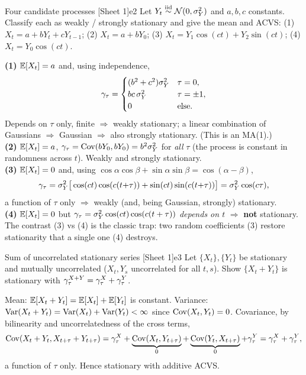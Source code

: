 \begin{exercise}{Four candidate processes \quad\textnormal{[Sheet 1]}}{e2}
Let $Y_t\overset{\text{iid}}{\sim} \mathcal N(0,\sigma_Y^2)$ and $a,b,c$ constants. Classify each as
weakly / strongly stationary and give the mean and ACVS:
(1) $X_t=a+bY_t+cY_{t-1}$;\;
(2) $X_t=a+bY_0$;\;
(3) $X_t=Y_1\cos(ct)+Y_2\sin(ct)$;\;
(4) $X_t=Y_0\cos(ct)$.
\end{exercise}
\begin{solution}
\textbf{(1)} $\mathbb{E}[X_t]=a$ and, using independence,
\[
\gamma_\tau=\begin{cases}(b^2+c^2)\sigma_Y^2 & \tau=0,\\ bc\,\sigma_Y^2 & \tau=\pm1,\\ 0 &\text{else.}\end{cases}
\]
Depends on $\tau$ only, finite $\Rightarrow$ weakly stationary; a linear
combination of Gaussians $\Rightarrow$ Gaussian $\Rightarrow$ also strongly
stationary. (This is an MA(1).)\\
\textbf{(2)} $\mathbb{E}[X_t]=a$, $\gamma_\tau=\operatorname{Cov}(bY_0,bY_0)=b^2\sigma_Y^2$ for
\emph{all} $\tau$ (the process is constant in randomness across $t$). Weakly and
strongly stationary.\\
\textbf{(3)} $\mathbb{E}[X_t]=0$ and, using
$\cos\alpha\cos\beta+\sin\alpha\sin\beta=\cos(\alpha-\beta)$,
\[
\gamma_\tau=\sigma_Y^2\big[\cos(ct)\cos(c(t{+}\tau))+\sin(ct)\sin(c(t{+}\tau))\big]
=\sigma_Y^2\cos(c\tau),
\]
a function of $\tau$ only $\Rightarrow$ weakly (and, being Gaussian, strongly)
stationary.\\
\textbf{(4)} $\mathbb{E}[X_t]=0$ but
$\gamma_\tau=\sigma_Y^2\cos(ct)\cos(c(t+\tau))$ \emph{depends on $t$}
$\Rightarrow$ \textbf{not} stationary. The contrast (3) vs (4) is the classic
trap: two random coefficients (3) restore stationarity that a single one (4)
destroys.
\end{solution}

\begin{exercise}{Sum of uncorrelated stationary series \quad\textnormal{[Sheet 1]}}{e3}
Let $\{X_t\},\{Y_t\}$ be stationary and mutually uncorrelated ($X_t,Y_s$
uncorrelated for all $t,s$). Show $\{X_t+Y_t\}$ is stationary with
$\gamma^{X+Y}_\tau=\gamma^X_\tau+\gamma^Y_\tau$.
\end{exercise}
\begin{solution}
Mean: $\mathbb{E}[X_t+Y_t]=\mathbb{E}[X_t]+\mathbb{E}[Y_t]$ is constant. Variance:
$\operatorname{Var}(X_t+Y_t)=\operatorname{Var}(X_t)+\operatorname{Var}(Y_t)<\infty$ since $\operatorname{Cov}(X_t,Y_t)=0$.
Covariance, by bilinearity and uncorrelatedness of the cross terms,
\[
\operatorname{Cov}(X_t+Y_t,X_{t+\tau}+Y_{t+\tau})=\gamma^X_\tau+\underbrace{\operatorname{Cov}(X_t,Y_{t+\tau})}_{0}
+\underbrace{\operatorname{Cov}(Y_t,X_{t+\tau})}_{0}+\gamma^Y_\tau=\gamma^X_\tau+\gamma^Y_\tau,
\]
a function of $\tau$ only. Hence stationary with additive ACVS.
\end{solution}


